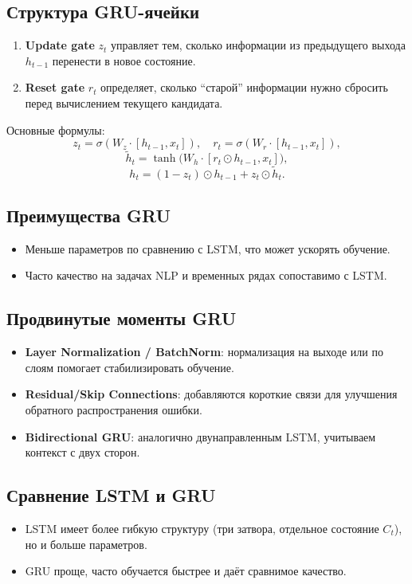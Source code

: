 \subsection{Структура GRU-ячейки}
\begin{enumerate}
    \item \textbf{Update gate} $z_t$ управляет тем, сколько информации из предыдущего выхода $h_{t-1}$ перенести в новое состояние.
    \item \textbf{Reset gate} $r_t$ определяет, сколько ``старой'' информации нужно сбросить перед вычислением текущего кандидата.
\end{enumerate}

Основные формулы:
\[
z_t = \sigma(W_z \cdot [h_{t-1}, x_t]), \quad
r_t = \sigma(W_r \cdot [h_{t-1}, x_t]),
\]
\[
\tilde{h}_t = \tanh \bigl(W_h \cdot [r_t \odot h_{t-1}, x_t]\bigr),
\]
\[
h_t = (1 - z_t)\odot h_{t-1} + z_t \odot \tilde{h}_t.
\]

\subsection{Преимущества GRU}
\begin{itemize}
    \item Меньше параметров по сравнению с LSTM, что может ускорять обучение.
    \item Часто качество на задачах NLP и временных рядах сопоставимо с LSTM.
\end{itemize}

\subsection{Продвинутые моменты GRU}
\begin{itemize}
    \item \textbf{Layer Normalization / BatchNorm}: нормализация на выходе или по слоям помогает стабилизировать обучение.
    \item \textbf{Residual/Skip Connections}: добавляются короткие связи для улучшения обратного распространения ошибки.
    \item \textbf{Bidirectional GRU}: аналогично двунаправленным LSTM, учитываем контекст с двух сторон.
\end{itemize}

\subsection{Сравнение LSTM и GRU}
\begin{itemize}
    \item LSTM имеет более гибкую структуру (три затвора, отдельное состояние $C_t$), но и больше параметров.
    \item GRU проще, часто обучается быстрее и даёт сравнимое качество.
\end{itemize}


